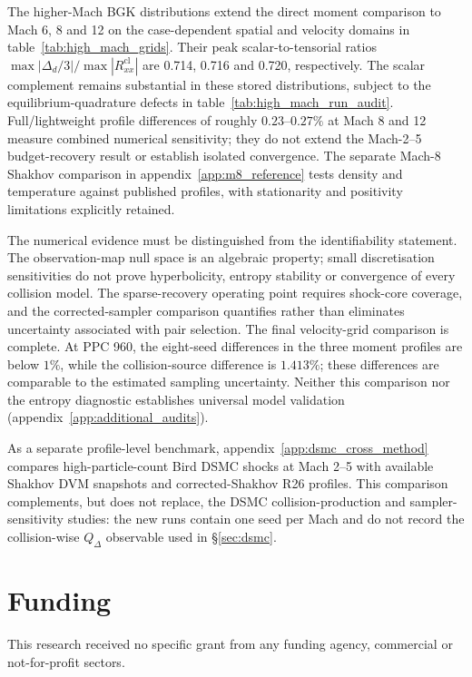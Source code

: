 \documentclass[lineno,paper]{JFM-FLM_Au}
\newenvironment{revision}{\nolinenumbers\begin{tcolorbox}[breakable,colback=revisionyellow,colframe=revisionyellow,boxrule=0pt,arc=0pt,left=5pt,right=5pt,top=5pt,bottom=5pt,before skip=6pt,after skip=6pt]\captionsetup{width=\linewidth}}{\end{tcolorbox}\linenumbers}
\newenvironment{revision}{}{}
\newcommand{\cl}{\mathrm{cl}}
\begin{document}
\begin{revision}
The higher-Mach BGK distributions extend the direct moment comparison to Mach 6, 8 and 12 on the case-dependent spatial and velocity domains in table~\ref{tab:high_mach_grids}. Their peak scalar-to-tensorial ratios $\max|\Delta_d/3|/\max|R^{\cl}_{xx}|$ are 0.714, 0.716 and 0.720, respectively. The scalar complement remains substantial in these stored distributions, subject to the equilibrium-quadrature defects in table~\ref{tab:high_mach_run_audit}. Full/lightweight profile differences of roughly $0.23$--$0.27\%$ at Mach 8 and 12 measure combined numerical sensitivity; they do not extend the Mach-2--5 budget-recovery result or establish isolated convergence. The separate Mach-8 Shakhov comparison in appendix~\ref{app:m8_reference} tests density and temperature against published profiles, with stationarity and positivity limitations explicitly retained.
\end{revision}


\begin{revision}
The numerical evidence must be distinguished from the identifiability statement. The observation-map null space is an algebraic property; small discretisation sensitivities do not prove hyperbolicity, entropy stability or convergence of every collision model. The sparse-recovery operating point requires shock-core coverage, and the corrected-sampler comparison quantifies rather than eliminates uncertainty associated with pair selection. The final velocity-grid comparison is complete. At PPC 960, the eight-seed differences in the three moment profiles are below $1\%$, while the collision-source difference is $1.413\%$; these differences are comparable to the estimated sampling uncertainty. Neither this comparison nor the entropy diagnostic establishes universal model validation (appendix~\ref{app:additional_audits}).
\end{revision}

\begin{revision}
As a separate profile-level benchmark, appendix~\ref{app:dsmc_cross_method} compares high-particle-count Bird DSMC shocks at Mach 2--5 with available Shakhov DVM snapshots and corrected-Shakhov R26 profiles. This comparison complements, but does not replace, the DSMC collision-production and sampler-sensitivity studies: the new runs contain one seed per Mach and do not record the collision-wise $Q_\Delta$ observable used in \S\ref{sec:dsmc}.
\end{revision}

\section*{Funding}
This research received no specific grant from any funding agency, commercial or not-for-profit sectors.
\end{document}
